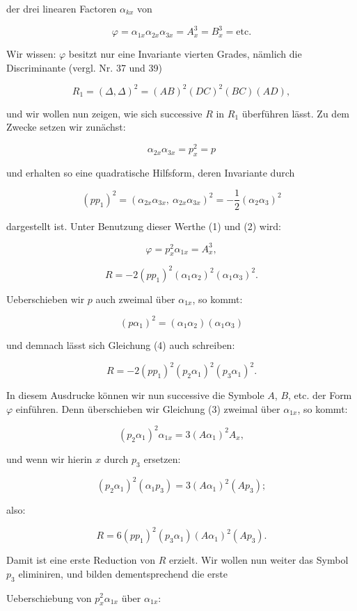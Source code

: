 \documentclass[11pt]{article}
\providecommand{\weberpage}[1]{}
\providecommand{\weq}[2]{\begin{equation}\tag{#1}#2\end{equation}}
\let\Delta\varDelta
\begin{document}
der drei linearen Factoren $\alpha_{kx}$ von

\[
\varphi=\alpha_{1x}\alpha_{2x}\alpha_{3x}=A_x^3=B_x^3=\text{etc.}
\]

Wir wissen: $\varphi$ besitzt nur eine Invariante vierten Grades, nämlich die Discriminante (vergl. Nr. 37 und 39)

\[
R_1=(\Delta,\Delta)^2=(AB)^2(DC)^2(BC)(AD),
\]

und wir wollen nun zeigen, wie sich successive $R$ in $R_1$ überführen lässt. Zu dem Zwecke setzen wir zunächst:

\weq{1}{\alpha_{2x}\alpha_{3x}=p_x^2=p}

und erhalten so eine quadratische Hilfsform, deren Invariante durch

\weq{2}{(pp_1)^2=(\alpha_{2x}\alpha_{3x},\ \alpha_{2x}\alpha_{3x})^2=-\frac{1}{2}(\alpha_2\alpha_3)^2}

dargestellt ist. Unter Benutzung dieser Werthe (1) und (2) wird:

\weq{3}{\varphi=p_x^2\alpha_{1x}=A_x^3,}

\weq{4}{R=-2(pp_1)^2(\alpha_1\alpha_2)^2(\alpha_1\alpha_3)^2.}

Ueberschieben wir $p$ auch zweimal über $\alpha_{1x}$, so kommt:

\weq{5}{(p\alpha_1)^2=(\alpha_1\alpha_2)(\alpha_1\alpha_3)}

und demnach lässt sich Gleichung (4) auch schreiben:

\weq{6}{R=-2(pp_1)^2(p_2\alpha_1)^2(p_3\alpha_1)^2.}

In diesem Ausdrucke können wir nun successive die Symbole $A$, $B$, etc. der Form $\varphi$ einführen. Denn überschieben wir Gleichung (3) zweimal über $\alpha_{1x}$, so kommt:

\weq{7}{(p_2\alpha_1)^2\alpha_{1x}=3(A\alpha_1)^2A_x,}

und wenn wir hierin $x$ durch $p_3$ ersetzen:

\weq{8}{(p_2\alpha_1)^2(\alpha_1p_3)=3(A\alpha_1)^2(Ap_3);}

also:

\weq{9}{R=6(pp_1)^2(p_3\alpha_1)(A\alpha_1)^2(Ap_3).}

Damit ist eine erste Reduction von $R$ erzielt. Wir wollen nun weiter das Symbol $p_3$ eliminiren, und bilden dementsprechend die erste


\weberpage{100}
Ueberschiebung von $p_x^2\alpha_{1x}$ über $\alpha_{1x}$:
\end{document}
